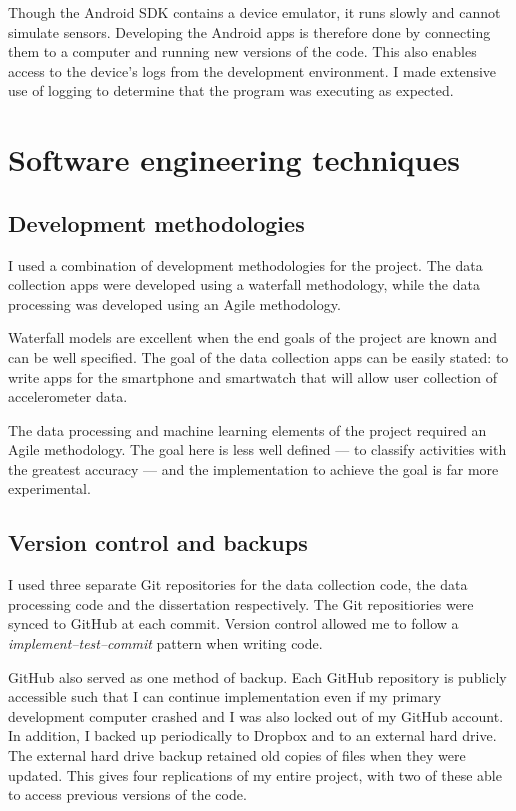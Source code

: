       Though the Android SDK contains a device emulator, it runs slowly and cannot simulate sensors. Developing the Android apps is therefore done by connecting them to a computer and running new versions of the code. This also enables access to the device's logs from the development environment. I made extensive use of logging to determine that the program was executing as expected.
  \section{Software engineering techniques}
    \subsection{Development methodologies}
      I used a combination of development methodologies for the project. The data collection apps were developed using a waterfall methodology, while the data processing was developed using an Agile methodology.
      
      Waterfall models are excellent when the end goals of the project are known and can be well specified. The goal of the data collection apps can be easily stated: to write apps for the smartphone and smartwatch that will allow user collection of accelerometer data.
      
      The data processing and machine learning elements of the project required an Agile methodology. The goal here is less well defined --- to classify activities with the greatest accuracy --- and the implementation to achieve the goal is far more experimental.
      
    \subsection{Version control and backups}
      I used three separate Git repositories for the data collection code, the data processing code and the dissertation respectively. The Git repositiories were synced to GitHub at each commit. Version control allowed me to follow a \emph{implement--test--commit} pattern when writing code. 
      
      GitHub also served as one method of backup. Each GitHub repository is publicly accessible such that I can continue implementation even if my primary development computer crashed and I was also locked out of my GitHub account. In addition, I backed up periodically to Dropbox and to an external hard drive. The external hard drive backup retained old copies of files when they were updated. This gives four replications of my entire project, with two of these able to access previous versions of the code.  
